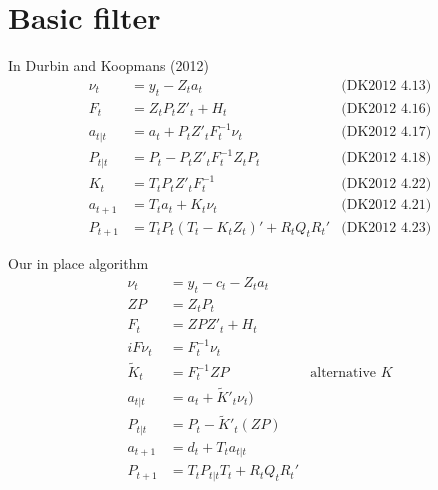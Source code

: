 \documentclass{article}
\begin{document}
\section{Basic filter}
In Durbin and Koopmans (2012)
\begin{align*}
  \nu_t &= y_t - Z_t a_t & \mbox{(DK2012 4.13)}\\
  F_t &= Z_tP_tZ'_t + H_t & \mbox{(DK2012 4.16)}\\
  a_{t|t} &= a_t + P_tZ'_t F^{-1}_t\nu_t & \mbox{(DK2012 4.17)}\\
  P_{t|t} &= P_t - P_tZ'_t F^{-1}_tZ_tP_t & \mbox{(DK2012 4.18)}\\
  K_t &= T_tP_tZ'_t F^{-1}_t & \mbox{(DK2012 4.22)}\\
  a_{t+1} &= T_ta_t + K_t\nu_t & \mbox{(DK2012 4.21)}\\
  P_{t+1} &= T_tP_t(T_t - K_tZ_t)' + R_tQ_tR_t' & \mbox{(DK2012 4.23)}
\end{align*}

Our in place algorithm
\begin{align*}
  \nu_t &= y_t - c_t - Z_t a_t \\
  ZP &= Z_tP_t \\
  F_t &= ZPZ'_t + H_t \\
  iF\nu_t &= F^{-1}_t\nu_t\\
  \tilde K_t &= F^{-1}_tZP & \mbox{alternative } K\\           
  a_{t|t} &= a_t + \tilde K'_t\nu_t)  \\
  P_{t|t} &= P_t - \tilde K'_t (ZP) \\
  a_{t+1} &= d_t + T_ta_{t|t}\\
  P_{t+1} &= T_tP_{t|t}T_t + R_tQ_tR_t' 
\end{align*}
\end{document}
